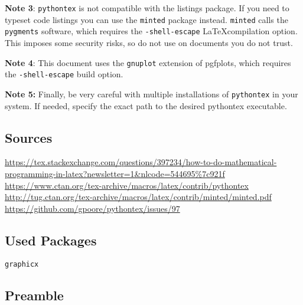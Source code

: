 \documentclass{article}
\begin{document}
\textbf{Note 3}: \verb|pythontex| is not compatible with the listings package. If you need to typeset code listings you can use the \verb|minted| package instead. \verb|minted| calls the \verb|pygments| software, which requires the \texttt{-shell-escape} \LaTeX compilation option. This imposes some security risks, so do not use on documents you do not trust.

\textbf{Note 4}: This document uses the \verb|gnuplot| extension of pgfplots, which requires the \texttt{-shell-escape} build option.

\textbf{Note 5:} Finally, be very careful with multiple installations of \verb|pythontex| in your system. If needed, specify the exact path to the desired pythontex executable.

\subsection*{Sources}
\url{https://tex.stackexchange.com/questions/397234/how-to-do-mathematical-programming-in-latex?newsletter=1&nlcode=544695%7c921f}\\
\url{https://www.ctan.org/tex-archive/macros/latex/contrib/pythontex}\\
\url{http://tug.ctan.org/tex-archive/macros/latex/contrib/minted/minted.pdf}\\
\url{https://github.com/gpoore/pythontex/issues/97}

\subsection*{Used Packages}
\verb|graphicx|

\subsection*{Preamble}
\begin{latex}
\usepackage[gobble=auto]{pythontex}
\usepackage{pgfplots} %
\usepackage{graphicx} %

\end{latex}
\end{document}
